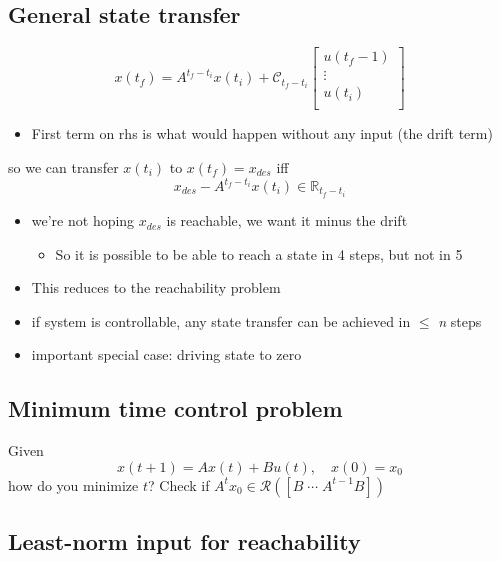 \documentclass[10pt,letterpaper]{article}
\begin{document}
\subsection{General state transfer}
\label{sec-18_1}

$$
x(t _{f}) = A ^{t_f-t_i} x(t_i) + \mathcal C_{t_f-t_i}
\begin{bmatrix}
  u(t_f-1) \\
  \vdots   \\
  u(t_i)   \\
\end{bmatrix}
$$
\begin{itemize}
\item First term on rhs is what would happen without any input (the drift term)
\end{itemize}
so we can transfer $x(t_i)$ to $x(t_f)=x _{des}$ iff
$$
x _{des} -A ^{t_f-t_i} x(t_i) \in \mathbb{R} _{t_f-t_i} 
$$
\begin{itemize}
\item we're not hoping $x_{des}$ is reachable, we want it minus the drift

\begin{itemize}
\item So it is possible to be able to reach a state in 4 steps, but not in 5
\end{itemize}

\item This reduces to the reachability problem
\item if system is controllable, any state transfer can be achieved in $\le$ \emph{n} steps
\item important special case: driving state to zero
\end{itemize}
\subsection{Minimum time control problem}
\label{sec-18_2}

Given
$$
x(t+1) = Ax(t) + Bu(t), \quad x(0) = x_0
$$
how do you minimize $t$? Check if $A ^{t} x_0 \in \mathcal R ([B \; \cdots \; A ^{t-1} B])$ 
\subsection{Least-norm input for reachability}
\label{sec-18_3}
\end{document}

